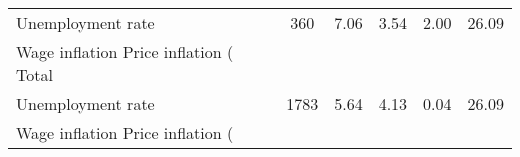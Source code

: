 \begin{table}[htbp]
\begin{tabular}{l*{1}{ccccc}}
Unemployment rate   &         360&        7.06&        3.54&        2.00&       26.09\\
Wage inflation %
Price inflation (%
\hline
Total               &            &            &            &            &            \\
Unemployment rate   &        1783&        5.64&        4.13&        0.04&       26.09\\
Wage inflation %
Price inflation (%
\hline\hline
\end{tabular}
\end{table}
